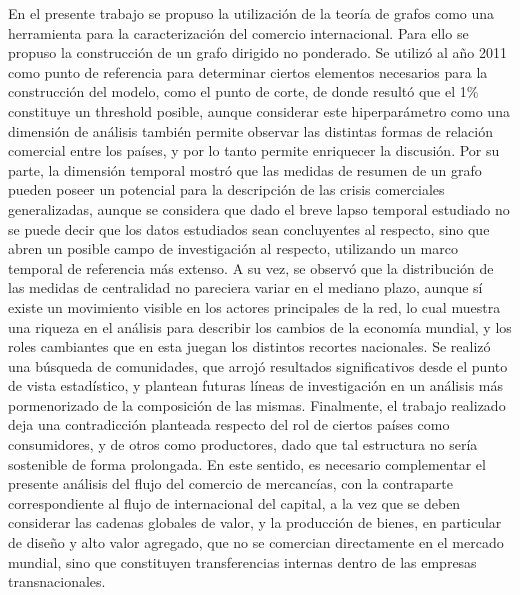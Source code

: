 \documentclass[runningheads,a4paper]{llncs}
\begin{document}
En el presente trabajo se propuso la utilización de la teoría de grafos como una herramienta para la caracterización del comercio internacional. Para ello se propuso la construcción de un grafo dirigido no ponderado.  Se utilizó al año 2011 como punto de referencia para determinar ciertos elementos necesarios para la construcción del modelo, como el punto de corte, de donde resultó que el 1\% constituye un threshold posible, aunque considerar este hiperparámetro como una dimensión de análisis también permite observar las distintas formas de relación comercial entre los países, y por lo tanto permite enriquecer la discusión. 
Por su parte, la dimensión temporal mostró que las medidas de resumen de un grafo pueden poseer un potencial para la descripción de las crisis comerciales generalizadas, aunque se considera que dado el breve lapso temporal estudiado no se puede decir que los datos estudiados sean concluyentes al respecto, sino que abren un posible campo de investigación al respecto, utilizando un marco temporal de referencia más extenso. 
A su vez, se observó que la distribución de las medidas de centralidad no pareciera variar en el mediano plazo, aunque sí existe un movimiento visible en los actores principales de la red, lo cual muestra una riqueza en el análisis para describir los cambios de la economía mundial, y los roles cambiantes que en esta juegan los distintos recortes nacionales. 
Se realizó una búsqueda de comunidades, que arrojó resultados significativos desde el punto de vista estadístico, y plantean futuras líneas de investigación en un análisis más pormenorizado de la composición de las mismas.
Finalmente, el trabajo realizado deja una contradicción planteada respecto del rol de ciertos países como consumidores, y de otros como productores, dado que tal estructura no sería sostenible de forma prolongada. En este sentido, es necesario complementar el presente análisis del flujo del comercio de mercancías, con la contraparte correspondiente al flujo de internacional del capital, a la vez que se deben considerar las cadenas globales de valor, y la producción de bienes, en particular de diseño y alto valor agregado, que no se comercian directamente en el mercado mundial, sino que constituyen transferencias internas dentro de las empresas transnacionales.




\end{document}
